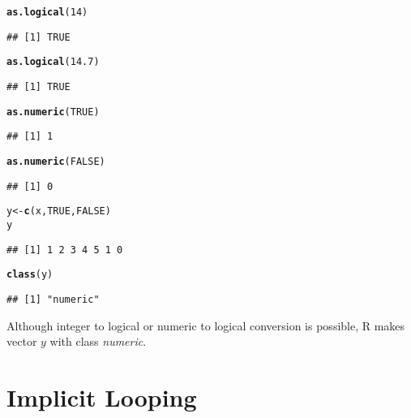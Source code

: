 \documentclass[11pt, a4paper]{article}\usepackage[]{graphicx}\usepackage[]{xcolor}
\makeatletter
\newcommand{\hlnum}[1]{\textcolor[rgb]{0.686,0.059,0.569}{#1}}%
\newcommand{\hldef}[1]{\textcolor[rgb]{0.345,0.345,0.345}{#1}}%
\newcommand{\hlkwb}[1]{\textcolor[rgb]{0.69,0.353,0.396}{#1}}%
\newcommand{\hlkwd}[1]{\textcolor[rgb]{0.737,0.353,0.396}{\textbf{#1}}}%
\newenvironment{kframe}{%
 \def\at@end@of@kframe{}%
 \ifinner\ifhmode%
  \def\at@end@of@kframe{\end{minipage}}%
  \begin{minipage}{\columnwidth}%
 \fi\fi%
 \def\FrameCommand##1{\hskip\@totalleftmargin \hskip-\fboxsep
 \colorbox{shadecolor}{##1}\hskip-\fboxsep
     \hskip-\linewidth \hskip-\@totalleftmargin \hskip\columnwidth}%
 \MakeFramed {\advance\hsize-\width
   \@totalleftmargin\z@ \linewidth\hsize
   \@setminipage}}%
 {\par\unskip\endMakeFramed%
 \at@end@of@kframe}
\newenvironment{knitrout}{}{} %
\makeatother
\begin{document}
\begin{knitrout}
\color{fgcolor}\begin{kframe}
\begin{alltt}
\hlkwd{as.logical}\hldef{(}\hlnum{14}\hldef{)}
\end{alltt}
\begin{verbatim}
## [1] TRUE
\end{verbatim}
\begin{alltt}
\hlkwd{as.logical}\hldef{(}\hlnum{14.7}\hldef{)}
\end{alltt}
\begin{verbatim}
## [1] TRUE
\end{verbatim}
\begin{alltt}
\hlkwd{as.numeric}\hldef{(}\hlnum{TRUE}\hldef{)}
\end{alltt}
\begin{verbatim}
## [1] 1
\end{verbatim}
\begin{alltt}
\hlkwd{as.numeric}\hldef{(}\hlnum{FALSE}\hldef{)}
\end{alltt}
\begin{verbatim}
## [1] 0
\end{verbatim}
\end{kframe}
\end{knitrout}


\begin{knitrout}
\color{fgcolor}\begin{kframe}
\begin{alltt}
\hldef{y} \hlkwb{<-} \hlkwd{c}\hldef{(x,} \hlnum{TRUE}\hldef{,} \hlnum{FALSE}\hldef{)}
\hldef{y}
\end{alltt}
\begin{verbatim}
## [1] 1 2 3 4 5 1 0
\end{verbatim}
\begin{alltt}
\hlkwd{class}\hldef{(y)}
\end{alltt}
\begin{verbatim}
## [1] "numeric"
\end{verbatim}
\end{kframe}
\end{knitrout}

Although integer to logical or numeric to logical conversion is possible, R makes vector $y$ with class \textit{numeric}.

\section{Implicit Looping}
\end{document}
